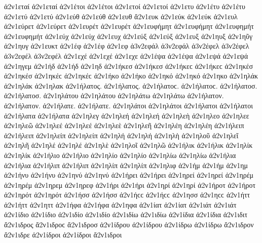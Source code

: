 {ἀ2ν1εταί ἀ2ν1εταί
ἀ2ν1έτοι ἀ2ν1έτοι   %
ἀ2ν1ετοί ἀ2ν1ετοί
ἀ2ν1ετυ   %
ἀ2ν1έτυ ἀ2ν1έτυ   %
ἀ2ν1ετύ ἀ2ν1ετύ
ἀ2ν1εύθ ἀ2ν1εύθ   %
ἀ2ν1ευθ
ἄ2ν1ευκ   %
ἀ2ν1εύκ ἀ2ν1εύκ
ἀ2ν1ευλ   %
ἀ2ν1εύρετ ἀ2ν1εύρετ   %
ἀ2ν1ευρέτ ἀ2ν1ευρέτ
ἀ2ν1ευφήμητ ἀ2ν1ευφήμητ   %
ἀ2ν1ευφημήτ ἀ2ν1ευφημήτ
ἀ2ν1εύχ ἀ2ν1εύχ   %
ἀ2ν1ευχ
ἀ2ν1εύξ ἀ2ν1εύξ   %
ἀ2ν1ευξ
ἀ2ν1ηυξ   %
ἀ2ν1ηῦγ   %
ἀ2ν1ηυγ
ἀ2ν1ευκτ   %
ἀ2ν1έφ ἀ2ν1έφ   %
ἀ2ν1εφ
ἀ3ν2εφάλ ἀ3ν2εφάλ   %
ἀ3ν2έφελ ἀ3ν2έφελ   %
ἀ3ν2εφέλ ἀ3ν2εφέλ
ἀ2ν1εχέ ἀ2ν1εχέ   %
ἀ2ν1εχε
ἀ2ν1έψα ἀ2ν1έψα   %
ἀ2ν1εψά ἀ2ν1εψά
ἀ2ν1ηγεμ   %
ἀ2ν1ήδ ἀ2ν1ήδ   %
ἀ2ν1ηδ
ἀ2ν1ήκεσ ἀ2ν1ήκεσ ἀ2ν1ήκεϲ ἀ2ν1ήκεϲ   %
ἀ2ν1ηκέσ ἀ2ν1ηκέσ ἀ2ν1ηκέϲ ἀ2ν1ηκέϲ
ἀ2ν1ήκο ἀ2ν1ήκο   %
ἀ2ν1ηκό ἀ2ν1ηκό
ἀ2ν1ηκο
ἀ2ν1ηλάκ ἀ2ν1ηλάκ   %
ἀ2ν1ηλακ
ἀ2ν1ήλατος. ἀ2ν1ήλατος. ἀ2ν1ήλατοϲ. ἀ2ν1ήλατοϲ.   %
ἀ2ν1ήλατοσ. ἀ2ν1ήλατοσ.
ἀ2ν1ηλάτου ἀ2ν1ηλάτου
ἀ2ν1ηλάτω ἀ2ν1ηλάτω
ἀ2ν1ήλατον. ἀ2ν1ήλατον.
ἀ2ν1ήλατε. ἀ2ν1ήλατε.
ἀ2ν1ηλάτοι ἀ2ν1ηλάτοι
ἀ2ν1ήλατοι ἀ2ν1ήλατοι
ἀ2ν1ήλατα ἀ2ν1ήλατα
ἀ2ν1ηλεγ   %
ἀ2ν1ηλεή ἀ2ν1ηλεή   %
ἀ2ν1ηλεὴ
ἀ2ν1ηλεο
ἀ2ν1ηλεε
ἀ2ν1ηλεῶ
ἀ2ν1ηλεέ ἀ2ν1ηλεέ
ἀ2ν1ηλεὲ
ἀ2ν1ηλεῆ
ἀ2ν1ηλέη ἀ2ν1ηλέη   %
ἀ2ν1ήλειπ ἀ2ν1ήλειπ   %
ἀ2ν1ηλείπ ἀ2ν1ηλείπ
ἀ2ν1ηλή ἀ2ν1ηλή   %
ἀ2ν1ηλὴ
ἀ2ν1ηλοῦ
ἀ2ν1ηλεῖ
ἀ2ν1ηλῆ
ἀ2ν1ηλέ ἀ2ν1ηλέ
ἀ2ν1ηλὲ
ἀ2ν1ηλοῖ
ἀ2ν1ηλῶ
ἀ2ν1ήλικ ἀ2ν1ήλικ   %
ἀ2ν1ηλίκ ἀ2ν1ηλίκ
ἀ2ν1ήλιο ἀ2ν1ήλιο   %
ἀ2ν1ηλίο ἀ2ν1ηλίο
ἀ2ν1ηλίω ἀ2ν1ηλίω
ἀ2ν1ήλια ἀ2ν1ήλια
ἀ2ν1ήλιπ ἀ2ν1ήλιπ   %
ἀ2ν1ηλίπ ἀ2ν1ηλίπ
ἀ2ν1ηλιφ   %
ἀ2ν1ήμ ἀ2ν1ήμ   %
ἀ2ν1ημ
ἀ2ν1ήνυ ἀ2ν1ήνυ   %
ἀ2ν1ηνύ ἀ2ν1ηνύ
ἀ2ν1ήρει ἀ2ν1ήρει   %
ἀ2ν1ηρεί ἀ2ν1ηρεί
ἀ2ν1ηρέμ ἀ2ν1ηρέμ   %
ἀ2ν1ηρεμ
ἀ2ν1ηρεφ   %
ἀ2ν1ήρι ἀ2ν1ήρι   %
ἀ2ν1ηρί ἀ2ν1ηρί
ἀ2ν1ήροτ ἀ2ν1ήροτ   %
ἀ2ν1ηρότ ἀ2ν1ηρότ
ἀ2ν1ήσσ ἀ2ν1ήσσ ἀ2ν1ήϲϲ ἀ2ν1ήϲϲ   %
ἀ2ν1ησσ ἀ2ν1ηϲϲ
ἀ2ν1ήττ ἀ2ν1ήττ   %
ἀ2ν1ηττ
ἀ2ν1ήφα ἀ2ν1ήφα   %
ἀ2ν1ηφα
ἀ2ν1ίατ ἀ2ν1ίατ   %
ἀ2ν1ιάτ ἀ2ν1ιάτ
ἀ2ν1ίδιο ἀ2ν1ίδιο   %
ἀ2ν1ιδίο ἀ2ν1ιδίο
ἀ2ν1ιδίω ἀ2ν1ιδίω
ἀ2ν1ίδια ἀ2ν1ίδια
ἀ2ν1ιδιτ   %
ἄ2ν1ιδρος ἄ2ν1ιδροϲ   %
ἄ2ν1ιδροσ
ἀ2ν1ίδρου ἀ2ν1ίδρου
ἀ2ν1ίδρω ἀ2ν1ίδρω
ἄ2ν1ιδρον
ἄ2ν1ιδρε
ἀ2ν1ίδροι ἀ2ν1ίδροι
ἄ2ν1ιδροι
}
